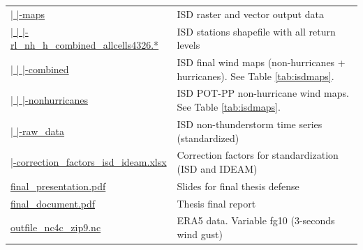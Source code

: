 \documentclass[12pt,oneside]{reedthesis}
\begin{document}
\begin{longtable}[t]{>{\raggedright\arraybackslash}p{2.2in}>{\raggedright\arraybackslash}p{4in}}
\href{ftp://ftp.geocorp.co/windthesis/potpp/isd/maps/}{  |    |-maps} & ISD raster and vector output data\\
\href{ftp://ftp.geocorp.co/windthesis/potpp/isd/maps/}{  |    |    |-rl\_nh\_h\_combined\_allcells4326.*} & ISD stations shapefile with all return levels\\
\href{ftp://ftp.geocorp.co/windthesis/potpp/isd/maps/combined/}{  |    |    |-combined} & ISD final wind maps (non-hurricanes + hurricanes). See Table \ref{tab:isdmaps}.\\
\href{ftp://ftp.geocorp.co/windthesis/potpp/isd/maps/nonhurricanes/}{  |    |    |-nonhurricanes} & ISD POT-PP non-hurricane wind maps. See Table \ref{tab:isdmaps}.\\
\href{ftp://ftp.geocorp.co/windthesis/potpp/isd/raw_data/}{  |    |-raw\_data} & ISD non-thunderstorm time series (standardized)\\
\href{ftp://ftp.geocorp.co/windthesis/potpp/correction_factors_isd_ideam.xlsx}{  |-correction\_factors\_isd\_ideam.xlsx} & Correction factors for standardization (ISD and IDEAM)\\
\href{ftp://ftp.geocorp.co/windthesis/final_presentation.pdf}{final\_presentation.pdf} & Slides for final thesis defense\\
\href{ftp://ftp.geocorp.co/windthesis/final_document.pdf}{final\_document.pdf} & Thesis final report\\
\href{ftp://ftp.geocorp.co/windthesis/outfile_nc4c_zip9.nc}{outfile\_nc4c\_zip9.nc} & ERA5 data. Variable fg10 (3-seconds wind gust)\\
\bottomrule
\end{longtable}
\endgroup{}
\end{document}
